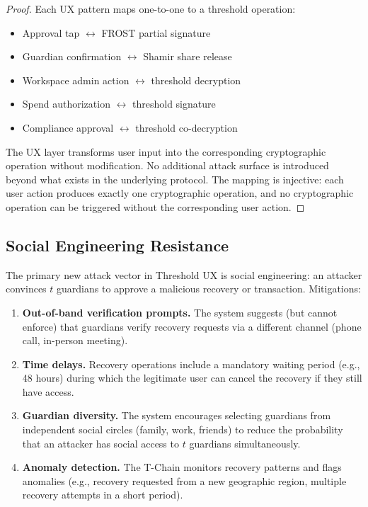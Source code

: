 \documentclass[11pt,a4paper]{article}
\begin{document}
\begin{proof}
Each UX pattern maps one-to-one to a threshold operation:
\begin{itemize}
    \item Approval tap $\leftrightarrow$ FROST partial signature
    \item Guardian confirmation $\leftrightarrow$ Shamir share release
    \item Workspace admin action $\leftrightarrow$ threshold decryption
    \item Spend authorization $\leftrightarrow$ threshold signature
    \item Compliance approval $\leftrightarrow$ threshold co-decryption
\end{itemize}
The UX layer transforms user input into the corresponding cryptographic
operation without modification. No additional attack surface is introduced
beyond what exists in the underlying protocol. The mapping is injective:
each user action produces exactly one cryptographic operation, and no
cryptographic operation can be triggered without the corresponding user action.
\end{proof}

\subsection{Social Engineering Resistance}

The primary new attack vector in Threshold UX is social engineering:
an attacker convinces $t$ guardians to approve a malicious recovery
or transaction. Mitigations:

\begin{enumerate}
    \item \textbf{Out-of-band verification prompts.} The system suggests
    (but cannot enforce) that guardians verify recovery requests via a
    different channel (phone call, in-person meeting).

    \item \textbf{Time delays.} Recovery operations include a mandatory
    waiting period (e.g., 48 hours) during which the legitimate user can
    cancel the recovery if they still have access.

    \item \textbf{Guardian diversity.} The system encourages selecting
    guardians from independent social circles (family, work, friends)
    to reduce the probability that an attacker has social access to
    $t$ guardians simultaneously.

    \item \textbf{Anomaly detection.} The T-Chain monitors recovery
    patterns and flags anomalies (e.g., recovery requested from a new
    geographic region, multiple recovery attempts in a short period).
\end{enumerate}
\end{document}
